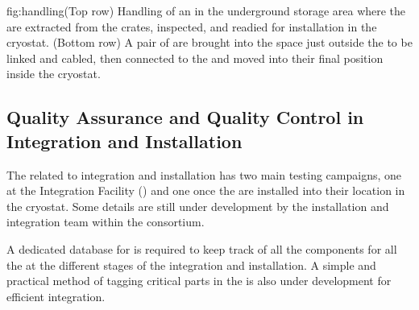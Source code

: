 \begin{dunefigure}{fig:handling}{(Top row) Handling of an  in the underground storage area where the  are extracted from the crates, inspected, and readied for installation in the cryostat. (Bottom row) A pair of  are brought into the space just outside the  to be linked and cabled, then connected to the  and moved into their final position inside the cryostat.}
\setlength{\fboxsep}{0pt}
\setlength{\fboxrule}{0.5pt}
\centering
{} 
\\ \vspace*{1.5mm}
\hspace*{-.25mm}
\hspace*{1.mm}
\end{dunefigure}


\subsection{Quality Assurance and Quality Control in Integration and Installation}
\label{sec:fdsp-apa-install-calib}

The  related to integration and installation has two main testing campaigns, one at the Integration Facility () and one once the  are installed into their location in the cryostat. Some details are still under development by the installation and integration team within the  consortium. 

A dedicated database for  is required to keep track of all the components for all the  at the different stages of the integration and installation. A simple and practical method of tagging critical parts in the  is also under development for efficient integration.

